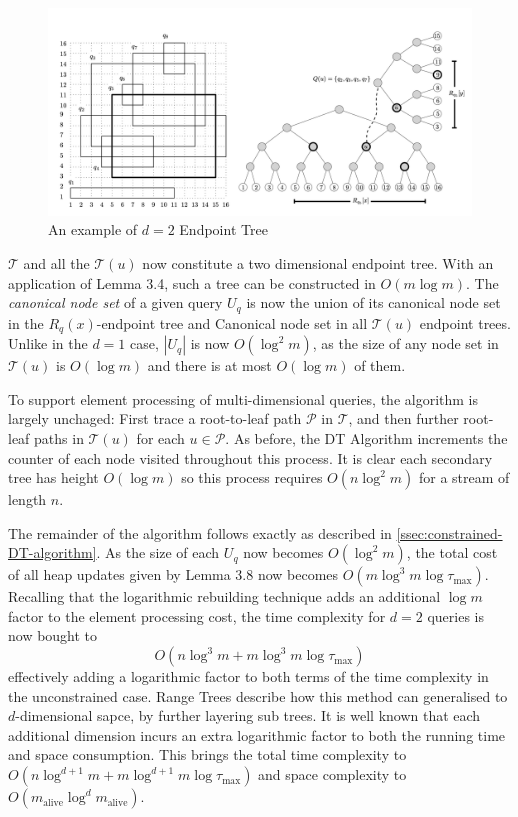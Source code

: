 \begin{figure}[h]
\includegraphics[scale=0.5]{thesis/figures/multdimexample.png}
\caption{An example of $d=2$ Endpoint Tree}
\end{figure}

$\mathcal{T}$ and all the $\mathcal{T}(u)$ now constitute a two dimensional endpoint tree. With an application of Lemma 3.4, such a tree can be constructed in $O(m\log m)$. The \textit{canonical node set} of a given query $U_q$ is now the union of its canonical node set in the $R_q(x)$-endpoint tree and Canonical node set in all $\mathcal{T}(u)$ endpoint trees. Unlike in the $d=1$ case, $|U_q|$ is now $O(\log^2m)$, as the size of any node set in $\mathcal{T}(u)$ is $O(\log m)$ and there is at most $O(\log m)$ of them.

To support element processing of multi-dimensional queries, the algorithm is largely unchaged: First trace a root-to-leaf path $\mathcal{P} $ in $\mathcal{T}$, and then further root-leaf paths in  $\mathcal{T}(u)$ for each $u\in\mathcal{P}$. As before, the DT Algorithm increments the counter of each node visited throughout this process. It is clear each secondary tree has height $O(\log m)$ so this process requires $O(n\log^2m)$ for a stream of length $n$.

The remainder of the algorithm follows exactly as described in \cref{ssec:constrained-DT-algorithm}. As the size of each $U_q$ now becomes $O(\log^2m)$, the total cost of all heap updates given by Lemma 3.8 now becomes $O(m\log^3m\log\tau_{\max})$. Recalling that the logarithmic rebuilding technique adds an additional $\log m$ factor to the element processing cost, the time complexity for $d=2$ queries is now bought to 
$$O(n\log^3m + m\log^3m\log\tau_{\max})$$
effectively adding a logarithmic factor to both terms of the time complexity in the unconstrained case. Range Trees \cite{RangeTrees, DBLP:books/lib/BergCKO08} describe how this method can generalised to $d$-dimensional sapce, by further layering sub trees. It is well known that each additional dimension incurs an extra logarithmic factor to both the running time and space consumption. This brings the total time complexity to $O(n\log^{d+1}m + m\log^{d+1}m\log\tau_{\max})$ and space complexity to $O(m_{\text{alive}}\log^d m_{\text{alive}})$.


